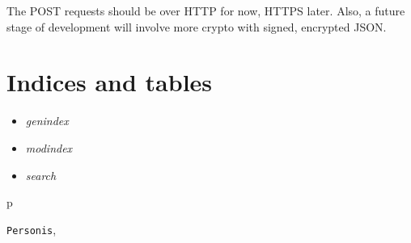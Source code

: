 \documentclass[a4paper,10pt,english]{sphinxmanual}
\begin{document}
The POST requests should be over HTTP for now, HTTPS later. Also, a future stage of development will involve more crypto with signed, encrypted JSON.


\chapter{Indices and tables}
\label{index:indices-and-tables}\begin{itemize}
\item {} 
\emph{genindex}

\item {} 
\emph{modindex}

\item {} 
\emph{search}

\end{itemize}


\renewcommand{\indexname}{Python Module Index}
\begin{theindex}
\def\bigletter#1{{\Large\sffamily#1}\nopagebreak\vspace{1mm}}
\bigletter{p}
\item {\texttt{Personis}}, \pageref{Client:module-Personis}
\end{theindex}

\renewcommand{\indexname}{Index}
\printindex
\end{document}
